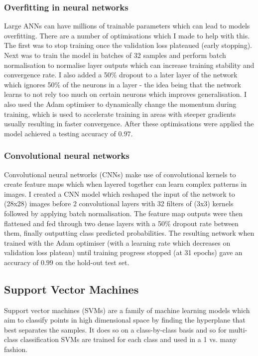 \documentclass[11pt]{article}
\begin{document}
\subsubsection{Overfitting in neural networks}

Large ANNs can have millions of trainable parameters which can lead to models overfitting. There are a number of optimisations which I made to help with this. The first was to stop training once the validation loss plateaued (early stopping). Next was to train the model in batches of 32 samples and perform batch normalisation to normalise layer outputs which can increase training stability and convergence rate. I also added a 50\% dropout to a later layer of the network which ignores 50\% of the neurons in a layer - the idea being that the network learns to not rely too much on certain neurons which improves generalisation. I also used the Adam optimiser to dynamically change the momentum during training, which is used to accelerate training in areas with steeper gradients usually resulting in faster convergence. After these optimisations were applied the model achieved a testing accuracy of $0.97$.

\subsubsection{Convolutional neural networks}

Convolutional neural networks (CNNs) make use of convolutional kernels to create feature maps which when layered together can learn complex patterns in images. I created a CNN model which reshaped the input of the network to (28x28) images before 2 convolutional layers with 32 filters of (3x3) kernels followed by applying batch normalisation. The feature map outputs were then flattened and fed through two dense layers with a 50\% dropout rate between them, finally outputting class predicted probabilities. The resulting network when trained with the Adam optimiser (with a learning rate which decreases on validation loss plateau) until training progress stopped (at 31 epochs) gave an accuracy of $0.99$ on the hold-out test set.

\subsection{Support Vector Machines}
\label{svms}

Support vector machines (SVMs) are a family of machine learning models which aim to classify points in high dimensional space by finding the hyperplane that best separates the samples. It does so on a class-by-class basis and so for multi-class classification SVMs are trained for each class and used in a 1 vs. many fashion. 
\end{document}
